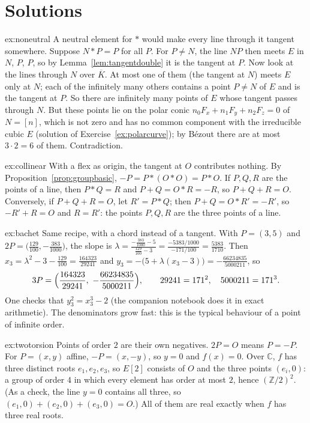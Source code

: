 \section{Solutions}

\begin{solution}{ex:noneutral}
\idea A neutral element for $*$ would make every line through it tangent somewhere.
\writeup Suppose $N*P=P$ for all $P$. For $P\ne N$, the line $NP$ then meets $E$ in $N$, $P$, $P$, so by Lemma~\ref{lem:tangentdouble} it is the tangent at
$P$. Now look at the lines through $N$ over $\overline K$. At most one of them (the tangent at $N$) meets $E$ only at $N$; each of the infinitely many others
contains a point $P\ne N$ of $E$ and is the tangent at $P$. So there are infinitely many points of $E$ whose tangent passes through $N$. But these points lie on
the polar conic $n_0F_x+n_1F_y+n_2F_z=0$ of $N=[n]$, which is not zero and has no common component with the irreducible cubic $E$ (solution of
Exercise~\ref{ex:polarcurve}); by B\'ezout there are at most $3\cdot2=6$ of them. Contradiction.
\end{solution}

\begin{solution}{ex:collinear}
\idea With a flex as origin, the tangent at $O$ contributes nothing.
\writeup By Proposition~\ref{prop:groupbasic}, $-P=P*(O*O)=P*O$. If $P,Q,R$ are the points of a line, then $P*Q=R$ and $P+Q=O*R=-R$, so $P+Q+R=O$. Conversely,
if $P+Q+R=O$, let $R'=P*Q$; then $P+Q=O*R'=-R'$, so $-R'+R=O$ and $R=R'$: the points $P,Q,R$ are the three points of a line.
\end{solution}

\begin{solution}{ex:bachet}
\idea Same recipe, with a chord instead of a tangent.
\writeup With $P=(3,5)$ and $2P=\bigl(\frac{129}{100},-\frac{383}{1000}\bigr)$, the slope is
$\lambda=\frac{-\frac{383}{1000}-5}{\frac{129}{100}-3}=\frac{-5383/1000}{-171/100}=\frac{5383}{1710}$. Then
$x_3=\lambda^2-3-\frac{129}{100}=\frac{164323}{29241}$ and $y_3=-\bigl(5+\lambda(x_3-3)\bigr)=-\frac{66234835}{5000211}$, so
\[
3P=\Bigl(\frac{164323}{29241},\ -\frac{66234835}{5000211}\Bigr),\qquad 29241=171^2,\quad 5000211=171^3.
\]
One checks that $y_3^2=x_3^3-2$ (the companion notebook does it in exact arithmetic). The denominators grow fast: this is the typical behaviour of a point of
infinite order.
\end{solution}

\begin{solution}{ex:twotorsion}
\idea Points of order $2$ are their own negatives.
\writeup $2P=O$ means $P=-P$. For $P=(x,y)$ affine, $-P=(x,-y)$, so $y=0$ and $f(x)=0$. Over $\mathbb C$, $f$ has three distinct roots $e_1,e_2,e_3$, so $E[2]$
consists of $O$ and the three points $(e_i,0)$: a group of order $4$ in which every element has order at most $2$, hence $(\mathbb Z/2)^2$. (As a check, the line
$y=0$ contains all three, so $(e_1,0)+(e_2,0)+(e_3,0)=O$.) All of them are real exactly when $f$ has three real roots.
\end{solution}


